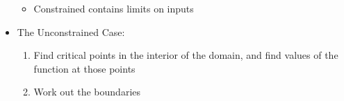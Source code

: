 \begin{itemize}
\begin{itemize}
      \item Constrained contains limits on inputs

    \end{itemize}

  \item The Unconstrained Case:

    \begin{enumerate}

      \item Find critical points in the interior of the domain, and find values of the function at those points

      \item Work out the boundaries

    \end{enumerate}

\end{itemize}



